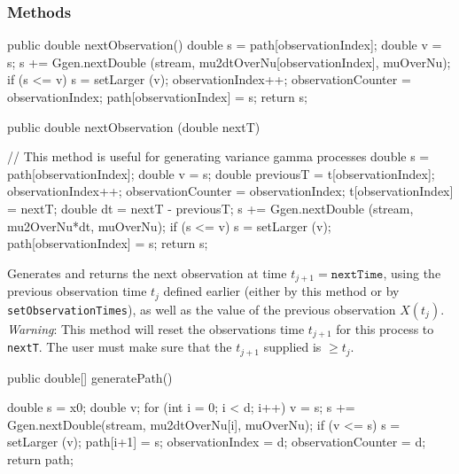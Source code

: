 \subsubsection* {Methods}
\begin{code}\begin{hide}
   public double nextObservation()  {
        double s = path[observationIndex];
        double v = s;
        s += Ggen.nextDouble (stream, mu2dtOverNu[observationIndex], muOverNu);
        if (s <= v)
             s = setLarger (v);
        observationIndex++;
        observationCounter = observationIndex;
        path[observationIndex] = s;
        return s;
    } \end{hide}

   public double nextObservation (double nextT) \begin{hide} {
        // This method is useful for generating variance gamma processes
        double s = path[observationIndex];
        double v = s;
        double previousT = t[observationIndex];
        observationIndex++;
        observationCounter = observationIndex;
        t[observationIndex] = nextT;
        double dt = nextT - previousT;
        s += Ggen.nextDouble (stream, mu2OverNu*dt, muOverNu);
        if (s <= v)
             s = setLarger (v);
        path[observationIndex] = s;
        return s;
    }\end{hide}
\end{code}
\begin{tabb} Generates and returns the next observation at time $t_{j+1} =
\texttt{nextTime}$,
using the previous observation time $t_{j}$ defined earlier
(either by this method or by \texttt{setObservationTimes}),
as well as the value of the previous observation $X(t_j)$.
\emph{Warning}: This method will reset the observations time $t_{j+1}$
for this process to \texttt{nextT}. The user must make sure that
the $t_{j+1}$ supplied is $\geq t_{j}$.
\end{tabb}
\begin{code}

   public double[] generatePath() \begin{hide}  {
        double s = x0;
        double v;
        for (int i = 0; i < d; i++) {
            v = s;
            s += Ggen.nextDouble(stream, mu2dtOverNu[i], muOverNu);
            if (v <= s)
               s = setLarger (v);
            path[i+1] = s;
        }
        observationIndex   = d;
        observationCounter = d;
        return path;
    } \end{hide}
\end{code}
